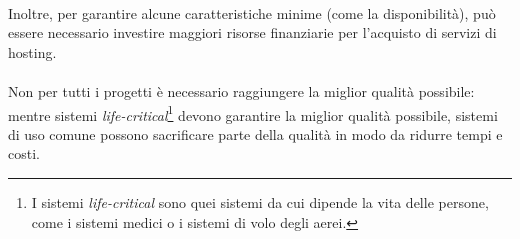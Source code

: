 \documentclass[12pt,a4paper,twoside,english,italian]{book}
\begin{document}
\paragraph{} Inoltre, per garantire alcune caratteristiche minime (come la disponibilità), può essere necessario investire maggiori risorse finanziarie per l'acquisto di servizi di hosting.

\paragraph{} Non per tutti i progetti è necessario raggiungere la miglior qualità possibile: mentre sistemi \emph{life-critical}\footnote{I sistemi \emph{life-critical} sono quei sistemi da cui dipende la vita delle persone, come i sistemi medici o i sistemi di volo degli aerei.} devono garantire la miglior qualità possibile, sistemi di uso comune possono sacrificare parte della qualità in modo da ridurre tempi e costi. 
\end{document}
